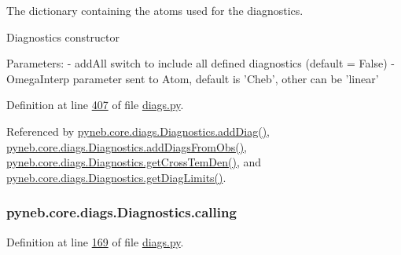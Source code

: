 The dictionary containing the atoms used for the diagnostics. 

\begin{DoxyVerb}Diagnostics constructor

Parameters:
    - addAll        switch to include all defined diagnostics (default = False)
    - OmegaInterp   parameter sent to Atom, default is 'Cheb', other can be 'linear'\end{DoxyVerb}
 

Definition at line \hyperlink{diags_8py_source_l00407}{407} of file \hyperlink{diags_8py_source}{diags.\-py}.



Referenced by \hyperlink{diags_8py_source_l00246}{pyneb.\-core.\-diags.\-Diagnostics.\-add\-Diag()}, \hyperlink{diags_8py_source_l00353}{pyneb.\-core.\-diags.\-Diagnostics.\-add\-Diags\-From\-Obs()}, \hyperlink{diags_8py_source_l00554}{pyneb.\-core.\-diags.\-Diagnostics.\-get\-Cross\-Tem\-Den()}, and \hyperlink{diags_8py_source_l00706}{pyneb.\-core.\-diags.\-Diagnostics.\-get\-Diag\-Limits()}.

\hypertarget{classpyneb_1_1core_1_1diags_1_1_diagnostics_a07dce673fec8b2383ef411ab94b0b2fe}{
\subsubsection[{calling}]{\setlength{\rightskip}{0pt plus 5cm}pyneb.\-core.\-diags.\-Diagnostics.\-calling}}\label{classpyneb_1_1core_1_1diags_1_1_diagnostics_a07dce673fec8b2383ef411ab94b0b2fe}


Definition at line \hyperlink{diags_8py_source_l00169}{169} of file \hyperlink{diags_8py_source}{diags.\-py}.



